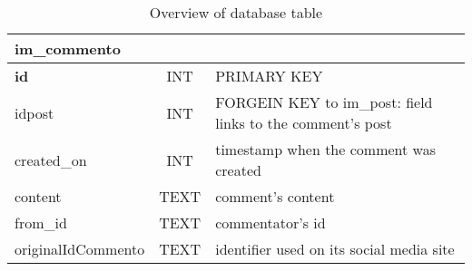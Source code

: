 \begin{table}[H]
\centering
\onehalfspacing

\begin{tabularx}{0.95\textwidth}{ l || c | X }
	\hline
	\multicolumn{3}{l}{ \textbf{im\_commento} } \\
	\hline

 	\textbf{id} & INT & PRIMARY KEY \\  
	idpost & INT & FORGEIN KEY to im\_post: \newline field links to the comment's post \\  
	created\_on & INT & timestamp when the comment was created \\
	content & TEXT & comment's content \\
	from\_id & TEXT & commentator's id \\
	originalIdCommento & TEXT & identifier used on its social media site \\
 
	\hline
\end{tabularx}

\caption{Overview of  database table}
\label{tab:im-commento}

\end{table}